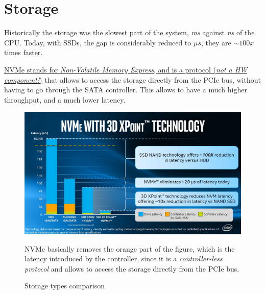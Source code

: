 \chapter{Storage}


\begin{paracol}{2}
   \colfill
   Historically the storage was the slowest part of the system, \textit{ms} against \textit{ns} of the CPU.
   Today, with SSDs, the gap is considerably reduced to \textit{$\mu s$}, they are $\sim 100x$ times faster.
   
   \ul{NVMe stands for \textit{Non-Volatile Memory Express}, and is a protocol (\textit{not a HW component!})} that allows to access the storage directly from the PCIe bus, without having to go through the SATA controller. This allows to have a much higher throughput, and a much lower latency.


   \colfill
   \switchcolumn

   \begin{figure}[htbp]
      \centering
      \includegraphics{images/storage_intel.jpg}
      \caption{Storage types comparison}
      \label{fig:storage_intel}
      NVMe basically removes the orange part of the figure, which is the latency introduced by the controller, since it is a \textit{controller-less protocol} and allows to access the storage directly from the PCIe bus.
   \end{figure}
\end{paracol}


